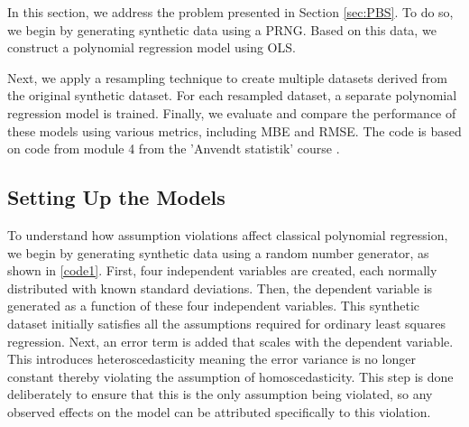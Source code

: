 


In this section, we address the problem presented in Section \ref{sec:PBS}. To do so, we begin by generating synthetic data using a PRNG. Based on this data, we construct a polynomial regression model using OLS.

\noindent Next, we apply a resampling technique to create multiple datasets derived from the original synthetic dataset. For each resampled dataset, a separate polynomial regression model is trained. Finally, we evaluate and compare the performance of these models using various metrics, including MBE and RMSE.
The code is based on code from module 4 from the 'Anvendt statistik' course \cite{ASTA}.

\subsection{Setting Up the Models}
To understand how assumption violations affect classical polynomial regression, we begin by generating synthetic data using a random number generator, as shown in \autoref{code1}. First, four independent variables are created, each normally distributed with known standard deviations. Then, the dependent variable is generated as a function of these four independent variables. This synthetic dataset initially satisfies all the assumptions required for ordinary least squares regression. Next, an error term is added that scales with the dependent variable. This introduces heteroscedasticity meaning the error variance is no longer constant thereby violating the assumption of homoscedasticity. This step is done deliberately to ensure that this is the only assumption being violated, so any observed effects on the model can be attributed specifically to this violation.
\\\\


